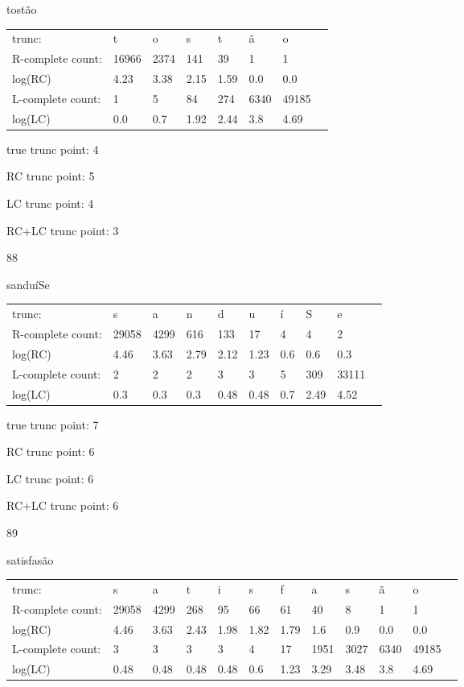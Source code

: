 \documentclass{article}
\begin{document}
tostão

\begin{tabular}{l|lllllll}
trunc: & t & o & s & t & ã & o & \\ 
R-complete count: & 16966 & 2374 & 141 & 39 & 1 & 1 & \\ 
log(RC) & 4.23 & 3.38 & 2.15 & 1.59 & 0.0 & 0.0 & \\ 
L-complete count: & 1 & 5 & 84 & 274 & 6340 & 49185 & \\ 
log(LC) & 0.0 & 0.7 & 1.92 & 2.44 & 3.8 & 4.69 & \\ 
\end{tabular}

true trunc point: 4

RC trunc point: 5

LC trunc point: 4

RC+LC trunc point: 3

\vspace{1em}

88

sanduíSe

\begin{tabular}{l|lllllllll}
trunc: & s & a & n & d & u & í & S & e & \\ 
R-complete count: & 29058 & 4299 & 616 & 133 & 17 & 4 & 4 & 2 & \\ 
log(RC) & 4.46 & 3.63 & 2.79 & 2.12 & 1.23 & 0.6 & 0.6 & 0.3 & \\ 
L-complete count: & 2 & 2 & 2 & 3 & 3 & 5 & 309 & 33111 & \\ 
log(LC) & 0.3 & 0.3 & 0.3 & 0.48 & 0.48 & 0.7 & 2.49 & 4.52 & \\ 
\end{tabular}

true trunc point: 7

RC trunc point: 6

LC trunc point: 6

RC+LC trunc point: 6

\newpage

89

satisfasão

\begin{tabular}{l|lllllllllll}
trunc: & s & a & t & i & s & f & a & s & ã & o & \\ 
R-complete count: & 29058 & 4299 & 268 & 95 & 66 & 61 & 40 & 8 & 1 & 1 & \\ 
log(RC) & 4.46 & 3.63 & 2.43 & 1.98 & 1.82 & 1.79 & 1.6 & 0.9 & 0.0 & 0.0 & \\ 
L-complete count: & 3 & 3 & 3 & 3 & 4 & 17 & 1951 & 3027 & 6340 & 49185 & \\ 
log(LC) & 0.48 & 0.48 & 0.48 & 0.48 & 0.6 & 1.23 & 3.29 & 3.48 & 3.8 & 4.69 & \\ 
\end{tabular}
\end{document}
